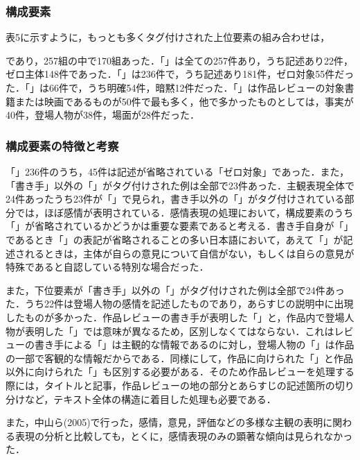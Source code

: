 \documentclass[japanese]{jnlp_1.3a}
\begin{document}
\subsubsection{構成要素}

表5に示すように，もっとも多くタグ付けされた上位要素の組み合わせは，


であり，257組の中で170組あった．「」は全ての257件あり，うち記述あり22件，ゼロ主体148件であった．「」は236件で，うち記述あり181件，ゼロ対象55件だった．「」は66件で，うち明確54件，暗黙12件だった．「」は作品レビューの対象書籍または映画であるものが50件で最も多く，他で多かったものとしては，事実が40件，登場人物が38件，場面が28件だった．

\subsubsection{構成要素の特徴と考察}

「」236件のうち，45件は記述が省略されている「ゼロ対象」であった．また，「書き手」以外の「」がタグ付けされた例は全部で23件あった．主観表現全体で24件あったうち23件が「」で見られ，書き手以外の「」がタグ付けされている部分では，ほぼ感情が表明されている．感情表現の処理において，構成要素のうち「」が省略されているかどうかは重要な要素であると考える．書き手自身が「」であるとき「」の表記が省略されることの多い日本語において，あえて「」が記述されるときは，主体が自らの意見について自信がない，もしくは自らの意見が特殊であると自認している特別な場合だった．

また，下位要素が「書き手」以外の「」がタグ付けされた例は全部で24件あった．うち22件は登場人物の感情を記述したものであり，あらすじの説明中に出現したものが多かった．作品レビューの書き手が表明した「」と，作品内で登場人物が表明した「」では意味が異なるため，区別しなくてはならない．これはレビューの書き手による「」は主観的な情報であるのに対し，登場人物の「」は作品の一部で客観的な情報だからである．同様にして，作品に向けられた「」と作品以外に向けられた「」も区別する必要がある．そのため作品レビューを処理する際には，タイトルと記事，作品レビューの地の部分とあらすじの記述箇所の切り分けなど，テキスト全体の構造に着目した処理も必要である．

また，中山ら(2005)で行った，感情，意見，評価などの多様な主観の表明に関わる表現の分析と比較しても，とくに，感情表現のみの顕著な傾向は見られなかった．
\end{document}
